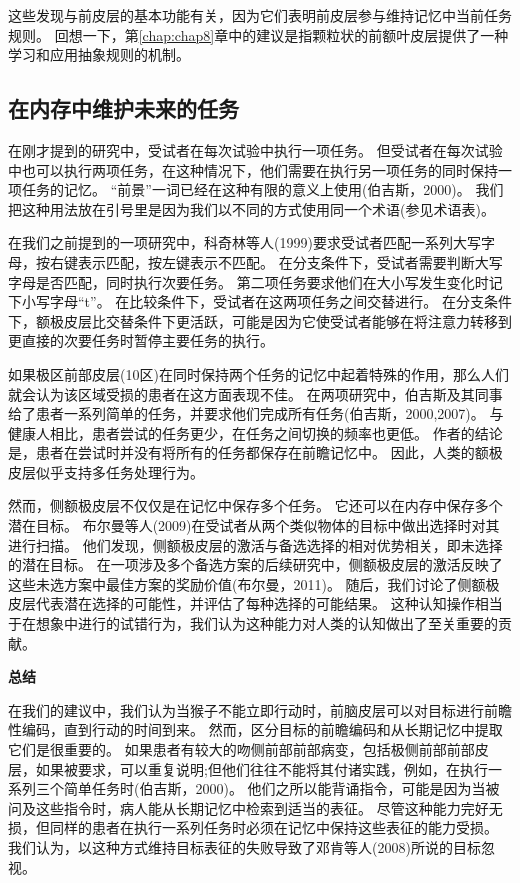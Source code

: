 \par

这些发现与前皮层的基本功能有关，因为它们表明前皮层参与维持记忆中当前任务规则。
回想一下，第\ref{chap:chap8}章中的建议是指颗粒状的前额叶皮层提供了一种学习和应用抽象规则的机制。



\subsection{在内存中维护未来的任务}
\par

在刚才提到的研究中，受试者在每次试验中执行一项任务。
但受试者在每次试验中也可以执行两项任务，在这种情况下，他们需要在执行另一项任务的同时保持一项任务的记忆。
“前景”一词已经在这种有限的意义上使用(伯吉斯，2000)。
我们把这种用法放在引号里是因为我们以不同的方式使用同一个术语(参见术语表)。
\par


在我们之前提到的一项研究中，科奇林等人(1999)要求受试者匹配一系列大写字母，按右键表示匹配，按左键表示不匹配。
在分支条件下，受试者需要判断大写字母是否匹配，同时执行次要任务。
第二项任务要求他们在大小写发生变化时记下小写字母“t”。
在比较条件下，受试者在这两项任务之间交替进行。
在分支条件下，额极皮层比交替条件下更活跃，可能是因为它使受试者能够在将注意力转移到更直接的次要任务时暂停主要任务的执行。
\par


如果极区前部皮层(10区)在同时保持两个任务的记忆中起着特殊的作用，那么人们就会认为该区域受损的患者在这方面表现不佳。
在两项研究中，伯吉斯及其同事给了患者一系列简单的任务，并要求他们完成所有任务(伯吉斯，2000,2007)。
与健康人相比，患者尝试的任务更少，在任务之间切换的频率也更低。
作者的结论是，患者在尝试时并没有将所有的任务都保存在前瞻记忆中。
因此，人类的额极皮层似乎支持多任务处理行为。
\par


然而，侧额极皮层不仅仅是在记忆中保存多个任务。
它还可以在内存中保存多个潜在目标。
布尔曼等人(2009)在受试者从两个类似物体的目标中做出选择时对其进行扫描。
他们发现，侧额极皮层的激活与备选选择的相对优势相关，即未选择的潜在目标。
在一项涉及多个备选方案的后续研究中，侧额极皮层的激活反映了这些未选方案中最佳方案的奖励价值(布尔曼，2011)。
随后，我们讨论了侧额极皮层代表潜在选择的可能性，并评估了每种选择的可能结果。
这种认知操作相当于在想象中进行的试错行为，我们认为这种能力对人类的认知做出了至关重要的贡献。
\par



\textbf{总结}
\par
在我们的建议中，我们认为当猴子不能立即行动时，前脑皮层可以对目标进行前瞻性编码，直到行动的时间到来。
然而，区分目标的前瞻编码和从长期记忆中提取它们是很重要的。
如果患者有较大的吻侧前部前部病变，包括极侧前部前部皮层，如果被要求，可以重复说明;但他们往往不能将其付诸实践，例如，在执行一系列三个简单任务时(伯吉斯，2000)。
他们之所以能背诵指令，可能是因为当被问及这些指令时，病人能从长期记忆中检索到适当的表征。
尽管这种能力完好无损，但同样的患者在执行一系列任务时必须在记忆中保持这些表征的能力受损。
我们认为，以这种方式维持目标表征的失败导致了邓肯等人(2008)所说的目标忽视。



